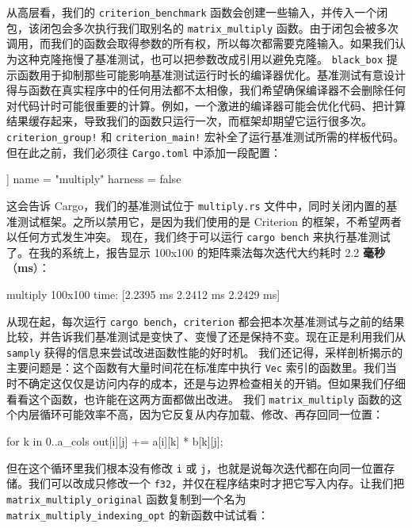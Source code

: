 \label{idx:idx_40985032}
\label{idx:idx_86c7cee2}
从高层看，我们的 \texttt{criterion\_\allowbreak{}benchmark} 函数会创建一些输入，并传入一个闭包，该闭包会多次执行我们取别名的 \texttt{matrix\_\allowbreak{}multiply} 函数。由于闭包会被多次调用，而我们的函数会取得参数的所有权，所以每次都需要克隆输入。如果我们认为这种克隆拖慢了基准测试，也可以把参数改成引用以避免克隆。
\texttt{black\_box} 提示函数用于抑制那些可能影响基准测试运行时长的编译器优化。基准测试有意设计得与函数在真实程序中的任何用法都不太相像，我们希望确保编译器不会删除任何对代码计时可能很重要的计算。例如，一个激进的编译器可能会优化代码、把计算结果缓存起来，导致我们的函数只运行一次，而框架却期望它运行很多次。
\texttt{criterion\_\allowbreak{}group!} 和 \texttt{criterion\_\allowbreak{}main!} 宏补全了运行基准测试所需的样板代码。但在此之前，我们必须往 \texttt{Cargo.toml} 中添加一段配置：
\begin{codeboxdark}
[[bench]]
name = "multiply"
harness = false
\end{codeboxdark}
这会告诉 Cargo，我们的基准测试位于 \texttt{multiply.rs} 文件中，同时关闭内置的基准测试框架。之所以禁用它，是因为我们使用的是 Criterion 的框架，不希望两者以任何方式发生冲突。
现在，我们终于可以运行 \texttt{cargo bench} 来执行基准测试了。在我的系统上，报告显示 100x100 的矩阵乘法每次迭代大约耗时 2.\allowbreak{}2 \textbf{毫秒}（\textbf{ms}）：
\begin{codeboxdark}
multiply 100x100        time:   [2.2395 ms 2.2412 ms 2.2429 ms]
\end{codeboxdark}
\label{idx:idx_e66662e4}
\label{idx:idx_277df2fc}
从现在起，每次运行 \texttt{cargo bench}，\texttt{criterion} 都会把本次基准测试与之前的结果比较，并告诉我们基准测试是变快了、变慢了还是保持不变。现在正是利用我们从 \texttt{samply} 获得的信息来尝试改进函数性能的好时机。
我们还记得，采样剖析揭示的主要问题是：这个函数有大量时间花在标准库中执行 \texttt{Vec} 索引的函数里。我们当时不确定这仅仅是访问内存的成本，还是与边界检查相关的开销。但如果我们仔细看看这个函数，也许能在这两方面都做出改进。
我们 \texttt{matrix\_\allowbreak{}multiply} 函数的这个内层循环可能效率不高，因为它反复从内存加载、修改、再存回同一位置：
\begin{codebox}[text]
for k in 0..a_cols {
    out[i][j] += a[i][k] * b[k][j];
}
\end{codebox}
但在这个循环里我们根本没有修改 \texttt{i} 或 \texttt{j}，也就是说每次迭代都在向同一位置存储。我们可以改成只修改一个 \texttt{f32}，并仅在程序结束时才把它写入内存。让我们把 \texttt{matrix\_\allowbreak{}multiply\_\allowbreak{}original} 函数复制到一个名为 \texttt{matrix\_\allowbreak{}multiply\_\allowbreak{}indexing\_\allowbreak{}opt} 的新函数中试试看：
